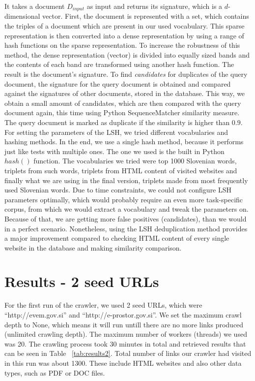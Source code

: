 \documentclass[9pt]{IEEEtran}
\begin{document}
It takes a document $D_{input}$ as input and returns its signature, which is a $d$-dimensional vector.
First, the document is represented with a set, which contains the triples of a document which are present in our used vocabulary.
This sparse representation is then converted into a dense representation by using a range of hash functions on the sparse representation.
To increase the robustness of this method, the dense representation (vector) is divided into equally sized bands and the contents of each band are transformed using another hash function.
The result is the document's signature.
To find \textit{candidates} for duplicates of the query document, the signature for the query document is obtained and compared against the signatures of other documents, stored in the database.
This way, we obtain a small amount of candidates, which are then compared with the query document again, this time using Python SequenceMatcher similarity measure.
The query document is marked as duplicate if the similarity is higher than $0.9$.
For setting the parameters of the LSH, we tried different vocabularies and hashing methods. 
In the end, we use a single hash method, because it performs just like tests with multiple ones.
The one we used is the built in Python $hash()$ function.
The vocabularies we tried were top 1000 Slovenian words, triplets from such words, triplets from HTML content of visited websites and finally what we are using in the final version, triplets made from most frequently used Slovenian words. 
Due to time constraints, we could not configure LSH parameters optimally, which would probably require an even more task-specific corpus, from which we would extract a vocabulary and tweak the parameters on.
Because of that, we are getting more false positives (candidates), than we would in a perfect scenario.
Nonetheless, using the LSH deduplication method provides a major improvement compared to checking HTML content of every single website in the database and making similarity comparison.


\section{Results - 2 seed URLs}\label{sec:results1}
For the first run of the crawler, we used 2 seed URLs, which were ``http://evem.gov.si'' and ``http://e-prostor.gov.si''. We set the maximum crawl depth to None, which means it will run untill there are no more links produced (unlimited crawling depth). The maximum number of workers (threads) we used was 20.
The crawling process took 30 minutes in total and retrieved results that can be seen in Table ~\ref{tab:results2}. Total number of links our crawler had visited in this run was about 1300. These include HTML websites and also other data types, such as PDF or DOC files.
\end{document}
